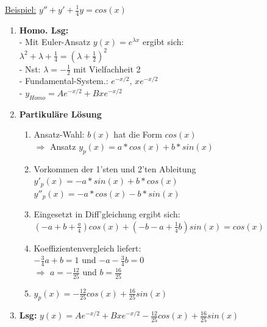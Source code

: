 \documentclass[6pt]{article}
\begin{document}
\begin{multicols*}{3}
		\underline{Beispiel:} 	\hspace{5mm} 		$y'' + y' + \frac{1}{4}y  = cos(x)$  \\
		\begin{enumerate}[label=(\roman*), itemsep=2pt, parsep=3pt]
				\item {\bf Homo. Lsg:} \\
						- Mit Euler-Ansatz $y(x)=e^{\lambda x}$ ergibt sich: \vspace{1mm} \\
						$\lambda^2 + \lambda + \frac{1}{4} = \left(\lambda + \frac{1}{2}\right)^2 $ \vspace{1mm} \\
						- Nst: $\lambda = -\frac{1}{2}$ mit Vielfachheit 2 \\
						- Fundamental-System.: $e^{-x/2}$, $xe^{-x/2}$ \\
						- $y_{Homo} = Ae^{-x/2} + Bxe^{-x/2}$
						\columnbreak
				\item {\bf Partikul{\"a}re L{\"o}sung}
					\vspace{-1mm}
					\begin{enumerate}[itemsep=1pt, parsep=2pt]
						\item Ansatz-Wahl: $b(x)$ hat die Form $cos(x)$ \\
							$\Rightarrow$ Ansatz $y_p(x) = a*cos(x) + b*sin(x)$
						\item Vorkommen der 1'sten und 2'ten Ableitung \\
								$y'_p(x) = -a*sin(x) + b*cos(x)$\\
								$y''_p(x) = -a*cos(x) -b*sin(x)$ \\
						\item Eingesetzt in Diff'gleichung ergibt sich: \\
							 $(-a + b + \frac{a}{4})cos(x) + (-b -a + \frac{1}{4}b)sin(x) = cos(x)$ 
						\item  Koeffizientenvergleich liefert: \\
								$-\frac{3}{4}a + b = 1$ und $-a - \frac{3}{4}b=0$ \\
								$\Rightarrow$ $a=-\frac{12}{25}$ und $b=\frac{16}{25}$
						\item $y_p(x) = -\frac{12}{25} cos(x) + \frac{16}{25} sin(x)$
					\end{enumerate}
				\vspace{-1mm}
				\item {\bf Lsg:}	\quad $y(x) = Ae^{-x/2} + Bxe^{-x/2} -\frac{12}{25} cos(x) + \frac{16}{25} sin(x)$
		\end{enumerate}


\end{multicols*}
\end{document}
